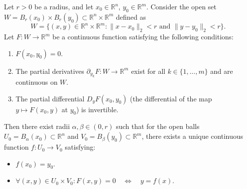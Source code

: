 \begin{theorem} \label{thm:ImplicitMappingTheorem}
    Let $r > 0$ be a radius, and let $x_0 \in \mathbb{R}^n$, $y_0 \in \mathbb{R}^m$. Consider the open set $W = B_r(x_0) \times B_r(y_0) \subset \mathbb{R}^n \times \mathbb{R}^m$ defined as
$$
W = \{ (x, y) \in \mathbb{R}^n \times \mathbb{R}^m : \| x - x_0 \|_2 < r \text{ and } \| y - y_0 \|_2 < r \}.
$$
Let $F: W \to \mathbb{R}^m$ be a continuous function satisfying the following conditions:
\begin{enumerate}
    \item $F(x_0, y_0) = 0$.
    \item The partial derivatives $\partial_{y_k} F : W \to \mathbb{R}^m$ exist for all $k \in \{1, \dots, m\}$ and are continuous on $W$.
    \item The partial differential $D_y F(x_0, y_0)$ (the differential of the map $y \mapsto F(x_0, y)$ at $y_0$) is invertible.
\end{enumerate}
Then there exist radii $\alpha, \beta \in (0, r)$ such that for the open balls $U_0 = B_\alpha(x_0) \subset \mathbb{R}^n$ and $V_0 = B_\beta(y_0) \subset \mathbb{R}^m$, there exists a unique continuous function $f: U_0 \to V_0$ satisfying:
\begin{itemize}
    \item $f(x_0) = y_0$.
    \item $\forall (x, y) \in U_0 \times V_0: F(x, y) = 0 \quad \iff \quad y = f(x). $
\end{itemize}
\end{theorem}

